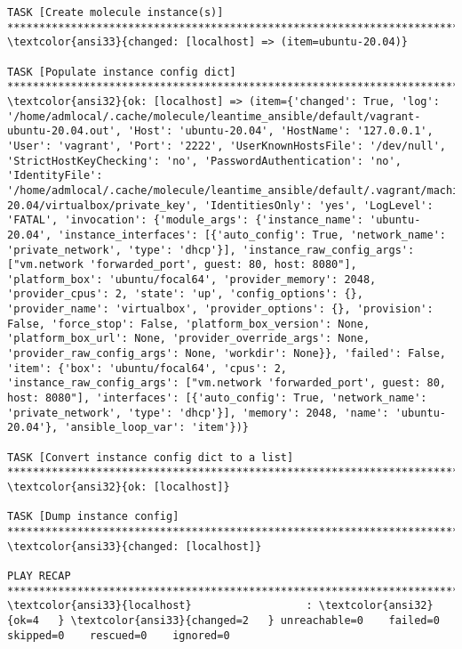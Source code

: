 \documentclass{scrartcl}
\begin{document}
\begin{Verbatim}
TASK [Create molecule instance(s)] *******************************************************************************************************
\textcolor{ansi33}{changed: [localhost] => (item=ubuntu-20.04)}

TASK [Populate instance config dict] *****************************************************************************************************
\textcolor{ansi32}{ok: [localhost] => (item={'changed': True, 'log': '/home/admlocal/.cache/molecule/leantime_ansible/default/vagrant-ubuntu-20.04.out', 'Host': 'ubuntu-20.04', 'HostName': '127.0.0.1', 'User': 'vagrant', 'Port': '2222', 'UserKnownHostsFile': '/dev/null', 'StrictHostKeyChecking': 'no', 'PasswordAuthentication': 'no', 'IdentityFile': '/home/admlocal/.cache/molecule/leantime_ansible/default/.vagrant/machines/ubuntu-20.04/virtualbox/private_key', 'IdentitiesOnly': 'yes', 'LogLevel': 'FATAL', 'invocation': {'module_args': {'instance_name': 'ubuntu-20.04', 'instance_interfaces': [{'auto_config': True, 'network_name': 'private_network', 'type': 'dhcp'}], 'instance_raw_config_args': ["vm.network 'forwarded_port', guest: 80, host: 8080"], 'platform_box': 'ubuntu/focal64', 'provider_memory': 2048, 'provider_cpus': 2, 'state': 'up', 'config_options': {}, 'provider_name': 'virtualbox', 'provider_options': {}, 'provision': False, 'force_stop': False, 'platform_box_version': None, 'platform_box_url': None, 'provider_override_args': None, 'provider_raw_config_args': None, 'workdir': None}}, 'failed': False, 'item': {'box': 'ubuntu/focal64', 'cpus': 2, 'instance_raw_config_args': ["vm.network 'forwarded_port', guest: 80, host: 8080"], 'interfaces': [{'auto_config': True, 'network_name': 'private_network', 'type': 'dhcp'}], 'memory': 2048, 'name': 'ubuntu-20.04'}, 'ansible_loop_var': 'item'})}

TASK [Convert instance config dict to a list] ********************************************************************************************
\textcolor{ansi32}{ok: [localhost]}

TASK [Dump instance config] **************************************************************************************************************
\textcolor{ansi33}{changed: [localhost]}

PLAY RECAP *******************************************************************************************************************************
\textcolor{ansi33}{localhost}                  : \textcolor{ansi32}{ok=4   } \textcolor{ansi33}{changed=2   } unreachable=0    failed=0    skipped=0    rescued=0    ignored=0


\end{Verbatim}
\end{document}

